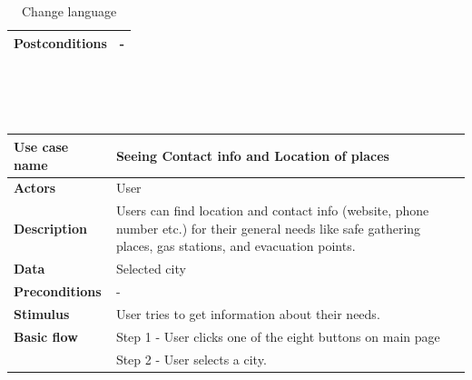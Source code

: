 \begin{center}
\begin{table}[H]
\begin{tabular}{| m{3cm}| m{10cm} |}
            \hline
            \textbf{Postconditions}   & -                                                                                                                         \\
            \hline
        \end{tabular}
        \caption[Change language]{Change language}
    \end{table}
    ~\\~\\~\\
    \begin{table}[H]
        \begin{tabular}{| m{3cm}| m{10cm} |}
            \hline
            \textbf{Use case name}    & Seeing Contact info and Location of places                                                                                                                     \\
            \hline
            \textbf{Actors}           & User                                                                                                                                                           \\
            \hline
            \textbf{Description}      & Users can find location and contact info (website, phone number etc.) for their general needs like safe gathering places, gas stations, and evacuation points. \\
            \hline
            \textbf{Data}             & Selected city                                                                                                                                                  \\
            \hline
            \textbf{Preconditions}    & -                                                                                                                                                              \\
            \hline
            \textbf{Stimulus}         & User tries to get information about their needs.                                                                                                               \\
            \hline
            \textbf{Basic flow}       & Step 1 - User clicks one of the eight buttons on main page                                                                                                     \\
                                      & Step 2 - User selects a city.                                                                                                                                  \\

\end{tabular}
\end{table}
\end{center}
